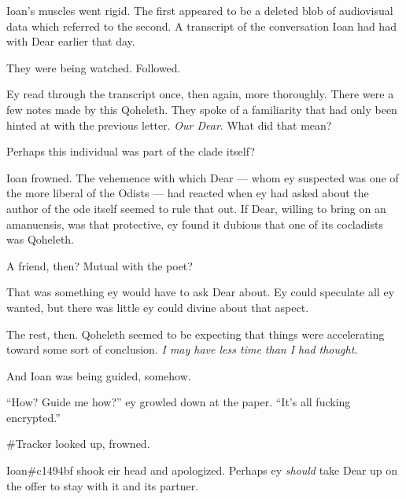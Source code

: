 Ioan's muscles went rigid. The first appeared to be a deleted blob of audiovisual data which referred to the second. A transcript of the conversation Ioan had had with Dear earlier that day.

They were being watched. Followed.

Ey read through the transcript once, then again, more thoroughly. There were a few notes made by this Qoheleth. They spoke of a familiarity that had only been hinted at with the previous letter. \emph{Our Dear}. What did that mean?

Perhaps this individual was part of the clade itself?

Ioan frowned. The vehemence with which Dear — whom ey suspected was one of the more liberal of the Odists — had reacted when ey had asked about the author of the ode itself seemed to rule that out. If Dear, willing to bring on an amanuensis, was that protective, ey found it dubious that one of its cocladists was Qoheleth.

A friend, then? Mutual with the poet?

That was something ey would have to ask Dear about. Ey could speculate all ey wanted, but there was little ey could divine about that aspect.

The rest, then. Qoheleth seemed to be expecting that things were accelerating toward some sort of conclusion. \emph{I may have less time than I had thought.}

And Ioan was being guided, somehow.

``How? Guide me how?'' ey growled down at the paper. ``It's all fucking encrypted.''

\#Tracker looked up, frowned.

Ioan\#c1494bf shook eir head and apologized. Perhaps ey \emph{should} take Dear up on the offer to stay with it and its partner.
